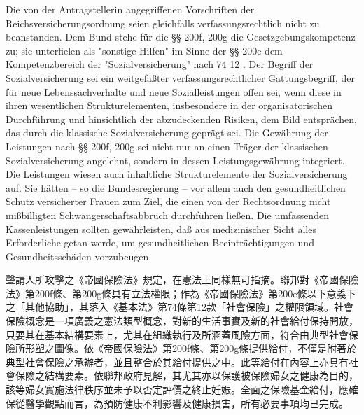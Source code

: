 \documentclass[12pt]{article}
\begin{document}
\begin{sourcepara}[title={原文理由 B.II.1} Rn 102]
Die von der Antragstellerin angegriffenen Vorschriften der Reichsversicherungsordnung seien gleichfalls verfassungsrechtlich nicht zu beanstanden. Dem Bund stehe für die §§ 200f, 200g \abbrRVO{} die Gesetzgebungskompetenz zu; sie unterfielen als "sonstige Hilfen" im Sinne der §§ 200e \abbrFF{} \abbrRVO{} dem Kompetenzbereich der "Sozialversicherung" nach \abbrArt{} 74 \abbrNr{} 12 \abbrGG{}\ggfnArtSeventyFourTwelveDE{}. Der Begriff der Sozialversicherung sei ein weitgefaßter verfassungsrechtlicher Gattungsbegriff, der für neue Lebenssachverhalte und neue Sozialleistungen offen sei, wenn diese in ihren wesentlichen Strukturelementen, insbesondere in der organisatorischen Durchführung und hinsichtlich der abzudeckenden Risiken, dem Bild entsprächen, das durch die klassische Sozialversicherung geprägt sei. Die Gewährung der Leistungen nach §§ 200f, 200g \abbrRVO{} sei nicht nur an einen Träger der klassischen Sozialversicherung angelehnt, sondern in dessen Leistungsgewährung integriert. Die Leistungen wiesen auch inhaltliche Strukturelemente der Sozialversicherung auf. Sie hätten -- so die Bundesregierung -- vor allem auch den gesundheitlichen Schutz versicherter Frauen zum Ziel, die einen von der Rechtsordnung nicht mißbilligten Schwangerschaftsabbruch durchführen ließen. Die umfassenden Kassenleistungen sollten gewährleisten, daß aus medizinischer Sicht alles Erforderliche getan werde, um gesundheitlichen Beeinträchtigungen und Gesundheitsschäden vorzubeugen.
\end{sourcepara}
\begin{transpara}
聲請人所攻擊之《帝國保險法》規定，在憲法上同樣無可指摘。聯邦對《帝國保險法》第200f條、第200g條具有立法權限；作為《帝國保險法》第200e條以下意義下之「其他協助」，其落入《基本法》第74條第12款\ggfnArtSeventyFourTwelveZH{}「社會保險」之權限領域。社會保險概念是一項廣義之憲法類型概念，對新的生活事實及新的社會給付保持開放，只要其在基本結構要素上，尤其在組織執行及所涵蓋風險方面，符合由典型社會保險所形塑之圖像。依《帝國保險法》第200f條、第200g條提供給付，不僅是附著於典型社會保險之承辦者，並且整合於其給付提供之中。此等給付在內容上亦具有社會保險之結構要素。依聯邦政府見解，其尤其亦以保護被保險婦女之健康為目的，該等婦女實施法律秩序並未予以否定評價之終止妊娠。全面之保險基金給付，應確保從醫學觀點而言，為預防健康不利影響及健康損害，所有必要事項均已完成。
\end{transpara}
\end{document}
